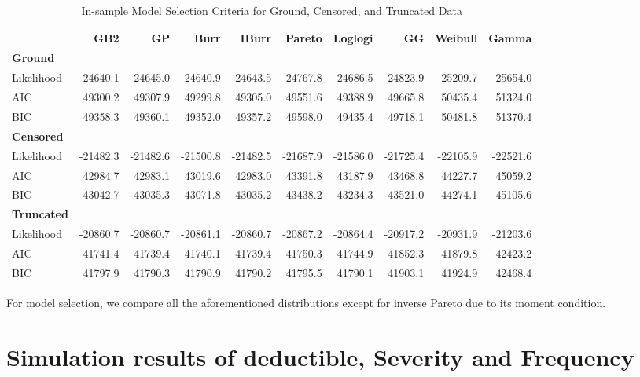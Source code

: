 \documentclass[11pt]{article}
\newcommand{\rev}[1]{{\color{blue}#1}}
\begin{document}
{\begin{table}[h!]
\renewcommand{\tabcolsep}{2mm}
\renewcommand{\arraystretch}{0.75}
\centering
\footnotesize
\begin{tabular}{lrrrrrrrrr}
\toprule
& \textbf{GB2} & \textbf{GP} & \textbf{Burr} & \textbf{IBurr} & \textbf{Pareto} & \textbf{Loglogi} & \textbf{GG} & \textbf{Weibull} & \textbf{Gamma} \\
\midrule
\textbf{Ground} \\
Likelihood & -24640.1 & -24645.0 & -24640.9 & -24643.5 & -24767.8 & -24686.5 & -24823.9 & -25209.7 & -25654.0 \\
AIC & 49300.2 & 49307.9 & 49299.8 & 49305.0 & 49551.6 & 49388.9 & 49665.8 & 50435.4 & 51324.0 \\
BIC & 49358.3 & 49360.1 & 49352.0 & 49357.2 & 49598.0 & 49435.4 & 49718.1 & 50481.8 & 51370.4 \\
\midrule
\textbf{Censored} \\
Likelihood & -21482.3 & -21482.6 & -21500.8 & -21482.5 & -21687.9 & -21586.0 & -21725.4 & -22105.9 & -22521.6 \\
AIC & 42984.7 & 42983.1 & 43019.6 & 42983.0 & 43391.8 & 43187.9 & 43468.8 & 44227.7 & 45059.2 \\
BIC & 43042.7 & 43035.3 & 43071.8 & 43035.2 & 43438.2 & 43234.3 & 43521.0 & 44274.1 & 45105.6 \\
\midrule
\textbf{Truncated} \\
Likelihood & -20860.7 & -20860.7 & -20861.1 & -20860.7 & -20867.2 & -20864.4 & -20917.2 & -20931.9 & -21203.6 \\
AIC & 41741.4 & 41739.4 & 41740.1 & 41739.4 & 41750.3 & 41744.9 & 41852.3 & 41879.8 & 42423.2 \\
BIC & 41797.9 & 41790.3 & 41790.9 & 41790.2 & 41795.5 & 41790.1 & 41903.1 & 41924.9 & 42468.4 \\
\bottomrule
\end{tabular}
\caption{In-sample Model Selection Criteria for Ground, Censored, and Truncated Data}
\label{tab:model_comparison}
\end{table}

For model selection, we compare all the \rev{aforementioned} distributions except for inverse Pareto due to its moment condition.

\pagebreak

\section{Simulation results of deductible, Severity and Frequency}
\label{app:B}

}
\end{document}
